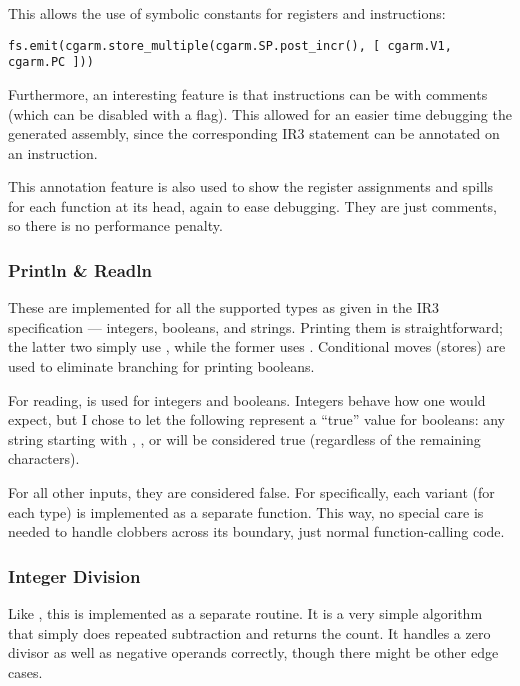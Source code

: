 \documentclass[12pt]{article}
\begin{document}
This allows the use of symbolic constants for registers and instructions:

\begin{verbatim}
fs.emit(cgarm.store_multiple(cgarm.SP.post_incr(), [ cgarm.V1, cgarm.PC ]))
\end{verbatim}

Furthermore, an interesting feature is that instructions can be  with comments (which can be disabled with a flag).
This allowed for an easier time debugging the generated assembly, since the corresponding IR3 statement can be annotated on an
instruction.

This annotation feature is also used to show the register assignments and spills for each function at its head, again to ease
debugging. They are just comments, so there is no performance penalty.



\subsubsection{Println \& Readln}

These are implemented for all the supported types as given in the IR3 specification --- integers, booleans, and strings. Printing
them is straightforward; the latter two simply use , while the former uses . Conditional moves (stores)
are used to eliminate branching for printing booleans.

For reading,  is used for integers and booleans. Integers behave how one would expect, but I chose to let the following
represent a \enquote{true} value for booleans: any string starting with , , or  will be considered true
(regardless of the remaining characters).

For all other inputs, they are considered false. For  specifically, each variant (for each type) is implemented as
a separate function. This way, no special care is needed to handle clobbers across its boundary, just normal function-calling code.



\subsubsection{Integer Division}

Like , this is implemented as a separate routine. It is a very simple algorithm that simply does repeated subtraction
and returns the count. It handles a zero divisor as well as negative operands correctly, though there might be other edge cases.
\end{document}
